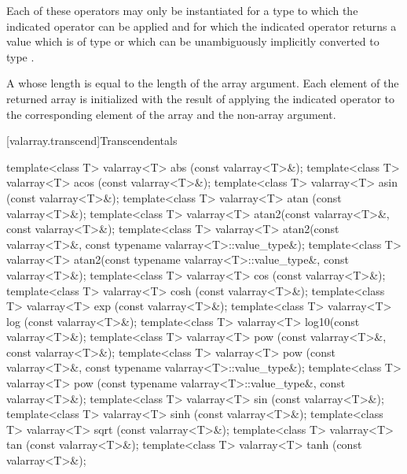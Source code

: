 \begin{itemdescr}
\pnum
\requires
Each of these operators may only be instantiated for a type 
to which the indicated operator can be applied and for which
the indicated operator returns a value which is of type 
or which can be unambiguously implicitly converted to type .

\pnum
\returns
A  whose
length is equal to the length of the array argument.
Each element
of the returned array is initialized with the result of applying the
indicated operator to the corresponding element of the array and the non-array argument.
\end{itemdescr}

[valarray.transcend]{Transcendentals}

%
%
%
%
%
%
%
%
%
%
%
%
%
%
%
%
\begin{itemdecl}
template<class T> valarray<T> abs  (const valarray<T>&);
template<class T> valarray<T> acos (const valarray<T>&);
template<class T> valarray<T> asin (const valarray<T>&);
template<class T> valarray<T> atan (const valarray<T>&);
template<class T> valarray<T> atan2(const valarray<T>&, const valarray<T>&);
template<class T> valarray<T> atan2(const valarray<T>&, const typename valarray<T>::value_type&);
template<class T> valarray<T> atan2(const typename valarray<T>::value_type&, const valarray<T>&);
template<class T> valarray<T> cos  (const valarray<T>&);
template<class T> valarray<T> cosh (const valarray<T>&);
template<class T> valarray<T> exp  (const valarray<T>&);
template<class T> valarray<T> log  (const valarray<T>&);
template<class T> valarray<T> log10(const valarray<T>&);
template<class T> valarray<T> pow  (const valarray<T>&, const valarray<T>&);
template<class T> valarray<T> pow  (const valarray<T>&, const typename valarray<T>::value_type&);
template<class T> valarray<T> pow  (const typename valarray<T>::value_type&, const valarray<T>&);
template<class T> valarray<T> sin  (const valarray<T>&);
template<class T> valarray<T> sinh (const valarray<T>&);
template<class T> valarray<T> sqrt (const valarray<T>&);
template<class T> valarray<T> tan  (const valarray<T>&);
template<class T> valarray<T> tanh (const valarray<T>&);
\end{itemdecl}

